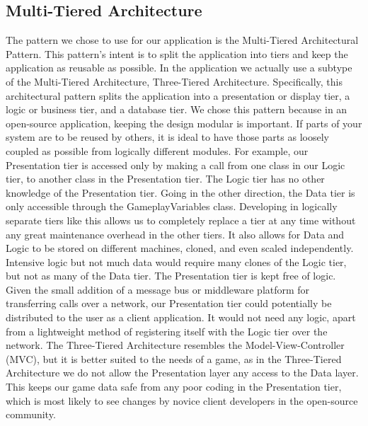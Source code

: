 \documentclass[11pt]{report}
\begin{document}
	\subsection{Multi-Tiered Architecture}
	The pattern we chose to use for our application is the Multi-Tiered Architectural Pattern. This pattern's intent is to split the application into tiers and keep the application as reusable as possible. In the application we actually use a subtype of the Multi-Tiered Architecture, Three-Tiered Architecture. Specifically, this architectural pattern splits the application into a presentation or display tier, a logic or business tier, and a database tier. We chose this pattern because in an open-source application, keeping the design modular is important. If parts of your system are to be reused by others, it is ideal to have those parts as loosely coupled as possible from logically different modules. For example, our Presentation tier is accessed only by making a call from one class in our Logic tier, to another class in the Presentation tier. The Logic tier has no other knowledge of the Presentation tier. Going in the other direction, the Data tier is only accessible through the GameplayVariables class. 
	Developing in logically separate tiers like this allows us to completely replace a tier at any time without any great maintenance overhead in the other tiers. It also allows for Data and Logic to be stored on different machines, cloned, and even scaled independently. Intensive logic but not much data would require many clones of the Logic tier, but not as many of the Data tier. The Presentation tier is kept free of logic. Given the small addition of a message bus or middleware platform for transferring calls over a network, our Presentation tier could potentially be distributed to the user as a client application. It would not need any logic, apart from a lightweight method of registering itself with the Logic tier over the network.
	The Three-Tiered Architecture resembles the Model-View-Controller (MVC), but it is better suited to the needs of a game, as in the Three-Tiered Architecture we do not allow the Presentation layer any access to the Data layer. This keeps our game data safe from any poor coding in the Presentation tier, which is most likely to see changes by novice client developers in the open-source community.
\end{document}
